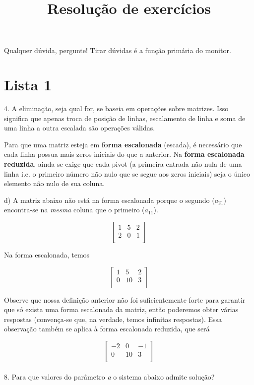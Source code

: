 \documentclass{article}
\title{Resolução de exercícios}
\date{}
\begin{document}
\maketitle{}

Qualquer dúvida, pergunte! Tirar dúvidas é a função primária do monitor.

\section{Lista 1}

4. A eliminação, seja qual for, se baseia em operações sobre matrizes. Isso significa que apenas troca de posição de linhas, escalamento de linha e soma de uma linha a outra escalada são operações válidas.

Para que uma matriz esteja em \textbf{forma escalonada} (escada), é necessário que cada linha possua mais zeros iniciais do que a anterior. Na \textbf{forma escalonada reduzida}, ainda se exige que cada pivot (a primeira entrada não nula de uma linha i.e. o primeiro número não nulo que se segue aos zeros iniciais) seja o único elemento não nulo de sua coluna. \vspace{2mm}
\par d) A matriz abaixo não está na forma escalonada porque o segundo ($a_{21}$) encontra-se na \textit{mesma} coluna que o primeiro ($a_{11}$).

\[ \begin{bmatrix} 
1 & 5 & 2 \\ 
2 & 0 & 1 \\ 
\end{bmatrix} \]

Na forma escalonada, temos

\[ \begin{bmatrix} 
1 & 5 & 2 \\ 
0 & 10 & 3 \\ 
\end{bmatrix} \]

Observe que nossa definição anterior não foi suficientemente forte para garantir que só exista uma forma escalonada da matriz, então poderemos obter várias respostas (convença-se que, na verdade, temos infinitas respostas). Essa observação também se aplica à forma escalonada reduzida, que será

\[ \begin{bmatrix} 
-2 & 0 & -1 \\ 
0 & 10 & 3 \\ 
\end{bmatrix} \] \vspace{2mm} \\  
8. Para que valores do parâmetro \textit{a} o sistema abaixo admite solução?
\end{document}
